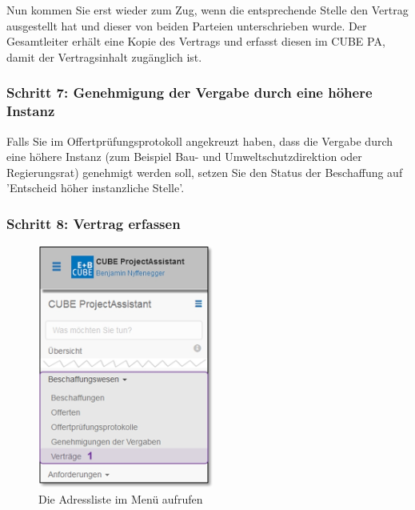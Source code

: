 \vspace{\baselineskip}

Nun kommen Sie erst wieder zum Zug, wenn die entsprechende Stelle den Vertrag ausgestellt hat und dieser von beiden Parteien unterschrieben wurde. Der Gesamtleiter erhält eine Kopie des Vertrags und erfasst diesen im CUBE PA, damit der Vertragsinhalt zugänglich ist.

\subsubsection{Schritt 7: Genehmigung der Vergabe durch eine höhere Instanz}

Falls Sie im Offertprüfungsprotokoll angekreuzt haben, dass die Vergabe durch eine höhere Instanz (zum Beispiel Bau- und Umweltschutzdirektion oder Regierungsrat) genehmigt werden soll, setzen Sie den Status der Beschaffung auf 'Entscheid höher instanzliche Stelle'.

\subsubsection{Schritt 8: Vertrag erfassen}

\begin{figure}
  \vspace{-30pt}      %
  \begin{center}
    \includegraphics[height=80mm]{../chapters/08_Beschaffungswesen/pictures/7-1-8_Menu_Besch_Vertraege.jpg}
  \end{center}
  \vspace{-20pt}
  \caption{Die Adressliste im Menü aufrufen}
  \vspace{-10pt}
\end{figure}

